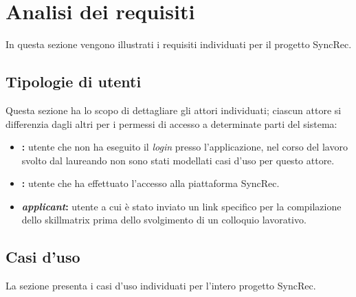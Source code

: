 
\chapter{Analisi dei requisiti}
\label{cap:descrizione-stage}
In questa sezione vengono illustrati i requisiti individuati per il progetto SyncRec.

\section{Tipologie di utenti}
Questa sezione ha lo scopo di dettagliare gli attori individuati; ciascun attore si differenzia dagli altri per i permessi di accesso a determinate parti del sistema:
\begin{itemize}	
	\item \textbf{\nonlogged:} utente che non ha eseguito il \textit{login} presso l'applicazione, nel corso del lavoro svolto dal laureando non sono stati modellati casi d'uso per questo attore.
	\item \textbf{\loggedusr:} utente che ha effettuato l'accesso alla piattaforma SyncRec.
	\item \textbf{\textit{applicant}:} utente a cui è stato inviato un link specifico per la compilazione dello skillmatrix prima dello svolgimento di un colloquio lavorativo. 
\end{itemize}

\section{Casi d'uso}
La sezione presenta i casi d'uso individuati per l'intero progetto SyncRec.

